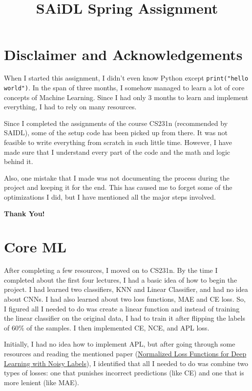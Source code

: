 \documentclass{article}
\title{\textbf{SAiDL Spring Assignment}}
\begin{document}
\maketitle

\section*{Disclaimer and Acknowledgements}
When I started this assignment, I didn't even know Python except \texttt{print("hello world")}. In the span of three months, I somehow managed to learn a lot of core concepts of Machine Learning. Since I had only 3 months to learn and implement everything, I had to rely on many resources.

Since I completed the assignments of the course CS231n (recommended by SAIDL), some of the setup code has been picked up from there. It was not feasible to write everything from scratch in such little time. However, I have made sure that I understand every part of the code and the math and logic behind it.

Also, one mistake that I made was not documenting the process during the project and keeping it for the end. This has caused me to forget some of the optimizations I did, but I have mentioned all the major steps involved.

\begin{center}
    \textbf{Thank You!}
\end{center}

\newpage

\section*{Core ML}

After completing a few resources, I moved on to CS231n. By the time I completed about the first four lectures, I had a basic idea of how to begin the project. I had learned two classifiers, KNN and Linear Classifier, and had no idea about CNNs. I had also learned about two loss functions, MAE and CE loss. So, I figured all I needed to do was create a linear function and instead of training the linear classifier on the original data, I had to train it after flipping the labels of 60\% of the samples. I then implemented CE, NCE, and APL loss.

Initially, I had no idea how to implement APL, but after going through some resources and reading the mentioned paper (\href{https://arxiv.org/abs/2006.13554}{Normalized Loss Functions for Deep Learning with Noisy Labels}), I identified that all I needed to do was combine two types of losses: one that punishes incorrect predictions (like CE) and one that is more lenient (like MAE).
\end{document}
